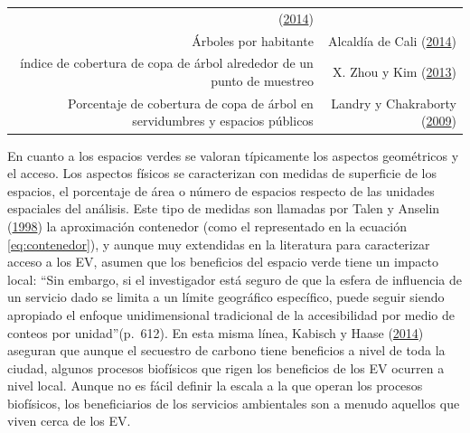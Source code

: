 \documentclass[12pt,a4paper,openany]{book}
\theoremstyle{definition}
\theoremstyle{definition}
\theoremstyle{definition}
\theoremstyle{remark}
\begin{document}
\begin{longtable}[]{@{}rr@{}}
\begin{minipage}[t]{0.31\columnwidth}
(\protect\hyperlink{ref-alanis_estructura_2014}{2014})\strut
\end{minipage}\tabularnewline
\begin{minipage}[t]{0.57\columnwidth}\raggedleft\strut
Árboles por habitante\strut
\end{minipage} & \begin{minipage}[t]{0.31\columnwidth}\raggedleft\strut
Alcaldía de Cali (\protect\hyperlink{ref-pot2014cali}{2014})\strut
\end{minipage}\tabularnewline
\begin{minipage}[t]{0.57\columnwidth}\raggedleft\strut
índice de cobertura de copa de árbol alrededor de un punto de
muestreo\strut
\end{minipage} & \begin{minipage}[t]{0.31\columnwidth}\raggedleft\strut
X. Zhou y Kim (\protect\hyperlink{ref-zhou_social_2013}{2013})\strut
\end{minipage}\tabularnewline
\begin{minipage}[t]{0.57\columnwidth}\raggedleft\strut
Porcentaje de cobertura de copa de árbol en servidumbres y espacios
públicos\strut
\end{minipage} & \begin{minipage}[t]{0.31\columnwidth}\raggedleft\strut
Landry y Chakraborty
(\protect\hyperlink{ref-landry_street_2009}{2009})\strut
\end{minipage}\tabularnewline
\bottomrule
\end{longtable}

En cuanto a los espacios verdes se valoran típicamente los aspectos
geométricos y el acceso. Los aspectos físicos se caracterizan con
medidas de superficie de los espacios, el porcentaje de área o número de
espacios respecto de las unidades espaciales del análisis. Este tipo de
medidas son llamadas por Talen y Anselin
(\protect\hyperlink{ref-talen_assessing_1998}{1998}) la aproximación
contenedor (como el representado en la ecuación \eqref{eq:contenedor}), y
aunque muy extendidas en la literatura para caracterizar acceso a los
EV, asumen que los beneficios del espacio verde tiene un impacto local:
``Sin embargo, si el investigador está seguro de que la esfera de
influencia de un servicio dado se limita a un límite geográfico
específico, puede seguir siendo apropiado el enfoque unidimensional
tradicional de la accesibilidad por medio de conteos por
unidad''(p.~612). En esta misma línea, Kabisch y Haase
(\protect\hyperlink{ref-kabisch_green_2014}{2014}) aseguran que aunque
el secuestro de carbono tiene beneficios a nivel de toda la ciudad,
algunos procesos biofísicos que rigen los beneficios de los EV ocurren a
nivel local. Aunque no es fácil definir la escala a la que operan los
procesos biofísicos, los beneficiarios de los servicios ambientales son
a menudo aquellos que viven cerca de los EV.
\end{document}
